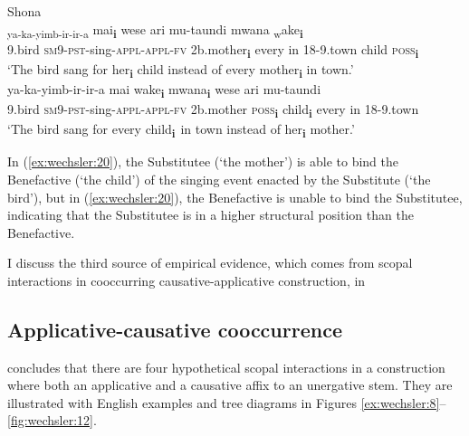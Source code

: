 \documentclass[output=paper,modfonts,nonflat,colorlinks,citecolor=brown]{langsci/langscibook}
\begin{document}
\ea\label{ex:wechsler:20}
Shona\\
\ea
{} {\textsubscript{ya-ka-yimb-ir-ir-a} } {mai}\textbf{{\textsubscript{i}}} {wese} {ari}  {{mu-taundi}}  {{mwana}} {\textsubscript{w}}{ake}\textbf{{\textsubscript{i}}}\\
 9.bird  \textsc{sm}9-\textsc{pst}{}-sing-\textsc{appl-appl-fv}  2b.mother\textbf{\textsubscript{i}}  every  in  {18-9.town}  {child}  \textsc{poss}\textbf{\textsubscript{i}}\\
\glt `The bird sang for her\textbf{\textsubscript{i}} child instead of every mother\textbf{\textsubscript{i}} in town.’   \\

\ex
{} {ya-ka-yimb-ir-ir-a} {mai} {wake\textbf{\textsubscript{i}}}  {{mwana\textbf{\textsubscript{i}}}}  {{wese}} {ari}  {{mu-taundi}}\\
 9.bird  \textsc{sm}9-\textsc{pst}{}-sing-\textsc{appl-appl-fv}  2b.mother  \textsc{poss}\textbf{\textsubscript{i}}  {child\textbf{\textsubscript{i}}}  {every}  in  {18-9.town}\\
\glt `The bird sang for every child\textbf{\textsubscript{i}}\textsubscript{~}in town instead of her\textbf{\textsubscript{i}} mother.'
\z
\z

In (\ref{ex:wechsler:20}), the Substitutee (‘the mother’) is able to bind the Benefactive (‘the child’) of the singing event enacted by the Substitute (‘the bird’), but in (\ref{ex:wechsler:20}), the Benefactive is unable to bind the Substitutee, indicating that the Substitutee is in a higher structural position than the Benefactive. 



I discuss the third source of empirical evidence, which comes from scopal interactions in cooccurring causative-applicative construction, in 

\subsection{Applicative-causative cooccurrence}\label{sec:wechsler:3.4}

\citet{Wechsler2016} concludes that there are four hypothetical scopal interactions in a construction where both an applicative and a causative affix to an unergative stem. They are illustrated with English examples and tree diagrams in Figures \ref{ex:wechsler:8}--\ref{fig:wechsler:12}. 
 
\end{document}
